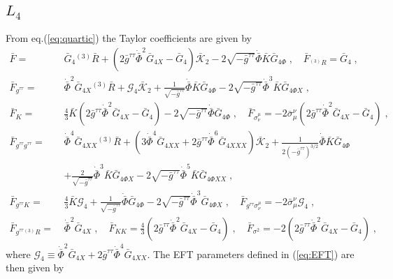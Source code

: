 \documentclass[a4paper,11pt]{article}
\numberwithin{equation}{section}
\begin{document}
\subsection{$L_4$}
From eq.(\ref{eq:quartic}) the Taylor coefficients are given by
\begin{align}
\bar{F} = \ & \bar{G}_4 {}^{(3)}\!\bar{R} + (2 \bar{g}^{\tau\tau} \dot{\bar{\Phi}}^2 \bar{G}_{4X} - \bar{G}_4 ) \mathcal{\bar{K}}_2 - 2 \sqrt{-\bar{g}^{\tau\tau}} \dot{\bar{\Phi}} \bar{K} \bar{G}_{4 \Phi} \;, \quad \bar{F}_{{}^{(3)}\!R} = \bar{G}_4\;, \nonumber \\ 
\bar{F}_{g^{\tau\tau}} = \ & \dot{\bar{\Phi}}^2 \bar{G}_{4X} {}^{(3)}\!\bar{R} + \mathcal{G}_4 \mathcal{\bar{K}}_2 + \frac{1}{\sqrt{-\bar{g}^{\tau\tau}}} \dot{\bar{\Phi}} \bar{K} \bar{G}_{4\Phi}  - 2 \sqrt{-\bar{g}^{\tau\tau}} \dot{\bar{\Phi}}^3 \bar{K} \bar{G}_{4 \Phi X} \;, \nonumber \\
\bar{F}_K = \ & \frac{4}{3} \bar{K} (2 \bar{g}^{\tau\tau} \dot{\bar{\Phi}}^2 \bar{G}_{4X} - \bar{G}_4) - 2 \sqrt{-\bar{g}^{\tau\tau}} \dot{\bar{\Phi}} \bar{G}_{4 \Phi} \;, \quad \bar{F}_{\sigma^\mu_\nu} = -2 \bar{\sigma}^\nu_\mu (2 \bar{g}^{\tau\tau} \dot{\bar{\Phi}}^2 \bar{G}_{4X} - \bar{G}_4 ) \;, \nonumber  \\
\bar{F}_{g^{\tau\tau}g^{\tau\tau}} =\ &\dot{\bar{\Phi}}^4 \bar{G}_{4XX} {}^{(3)}\!\bar{R} + (3 \dot{\bar{\Phi}}^4 \bar{G}_{4XX} + 2 \bar{g}^{\tau\tau} \dot{\bar{\Phi}}^6 \bar{G}_{4 XXX}) \mathcal{\bar{K}}_2  + \frac{1}{2 (-\bar{g}^{\tau\tau})^{3/2}} \dot{\bar{\Phi}} \bar{K} \bar{G}_{4\Phi} \\ 
&  + \frac{2}{\sqrt{-\bar{g}^{\tau\tau}}} \dot{\bar{\Phi}}^3 \bar{K} \bar{G}_{4 \Phi X} - 2 \sqrt{-\bar{g}^{\tau\tau}} \dot{\bar{\Phi}}^5 \bar{K} \bar{G}_{4 \Phi XX} \;, \nonumber \\ 
\bar{F}_{g^{\tau\tau} K} = \ &\frac{4}{3} \bar{K} \mathcal{G}_4 + \frac{1}{\sqrt{-\bar{g}^{\tau\tau}}} \dot{\bar{\Phi}} \bar{G}_{4\Phi} - 2 \sqrt{-\bar{g}^{\tau\tau}} \dot{\bar{\Phi}}^3 \bar{G}_{4 \Phi X} \;, \quad 
\bar{F}_{g^{\tau\tau} \sigma^\mu_\nu} = -2 \bar{\sigma}^\nu_\mu \mathcal{G}_4 \;, \nonumber \\
\bar{F}_{g^{\tau\tau} {}^{(3)}\!R} = \ & \dot{\bar{\Phi}}^2 \bar{G}_{4X} \;, \quad 
\bar{F}_{KK} =  \frac{4}{3} (2 \bar{g}^{\tau\tau} \dot{\bar{\Phi}}^2 \bar{G}_{4X} -  \bar{G}_4) \;, \quad
\bar{F}_{\sigma^2} = -2(2 \bar{g}^{\tau\tau} \dot{\bar{\Phi}}^2 \bar{G}_{4X} - \bar{G}_4) \;, \nonumber 
\end{align}
where $\mathcal{G}_4 \equiv \dot{\bar{\Phi}}^2 \bar{G}_{4X} + 2 \bar{g}^{\tau\tau} \dot{\bar{\Phi}}^4 \bar{G}_{4XX}$. The EFT parameters defined in (\ref{eq:EFT}) are then given by
\end{document}
